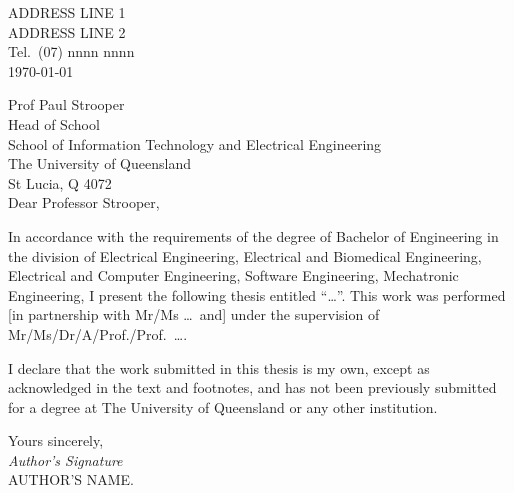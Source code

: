 \begin{flushright}
	ADDRESS LINE 1\\
	ADDRESS LINE 2\\
	Tel.\ (07) nnnn nnnn\\
	\medskip
	\today
\end{flushright}
\begin{flushleft}
  Prof Paul Strooper\\
  Head of School\\
  School of Information Technology and Electrical Engineering\\
  The University of Queensland\\
  St Lucia, Q 4072\\
  \bigskip\bigskip
  Dear Professor Strooper,
\end{flushleft}

In accordance with the requirements of the degree of Bachelor of
Engineering in the division of 
Electrical Engineering,
Electrical and Biomedical Engineering,
Electrical and Computer Engineering,
Software Engineering,
Mechatronic Engineering,
I present the
following thesis entitled ``\ldots''.  This work was performed [in
partnership with Mr/Ms \ldots\ and] under the supervision of
Mr/Ms/Dr/A/Prof./Prof.~\ldots.

I declare that the work submitted in this thesis is my own, except as
acknowledged in the text and footnotes, and has not been previously
submitted for a degree at The University of Queensland or any other
institution.

\begin{flushright}
	Yours sincerely,\\
	\medskip
	\emph{Author's Signature}\\
	\medskip
	AUTHOR'S NAME.
\end{flushright}
\pagebreak